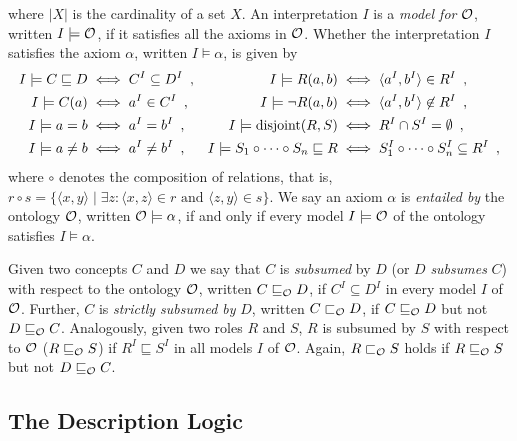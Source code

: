 where $|X|$ is the cardinality of a set $X$.
An interpretation $I$ is a \emph{model for} $\mathcal{O}$, written $I \models \mathcal{O}$, if it satisfies all the axioms in $\mathcal{O}$. Whether the interpretation $I$ satisfies the axiom $\alpha$, written $I \models \alpha$, is given by
\begin{align*}
  I \models C \sqsubseteq D &\iff C^I \subseteq D^I \enspace, &
  I \models R(a, b) &\iff \langle a^I, b^I \rangle \in R^I \enspace,\\
  I \models C(a) &\iff a^I \in C^I \enspace, &
  I \models \lnot R(a, b) &\iff \langle a^I, b^I \rangle \not\in R^I \enspace, \\
  I \models a = b &\iff a^I = b^I \enspace, &
  I \models \operatorname{disjoint}(R, S) &\iff R^I \cap S^I = \emptyset \enspace, \\
  I \models a \not= b &\iff a^I \not= b^I \enspace, &
  I \models S_1 \circ \cdots \circ S_n \sqsubseteq R &\iff S_1^I \circ \cdots \circ S_n^I \subseteq R^I \enspace,
\end{align*}
where $\circ$ denotes the composition of relations, that is, $r \circ s = \{ \langle x, y \rangle \mid \exists z : \langle x, z \rangle \in r \text{ and } \langle z, y \rangle \in s \}$. We say an axiom $\alpha$ is \emph{entailed by} the ontology $\mathcal{O}$, written $\mathcal{O} \models \alpha$, if and only if every model $I \models \mathcal{O}$ of the ontology satisfies $I \models \alpha$.

Given two concepts $C$ and $D$ we say that $C$ is \emph{subsumed} by $D$ (or $D$ \emph{subsumes} $C$) with respect to the ontology $\mathcal{O}$, written $C \sqsubseteq_\mathcal{O} D$, if $C^I \subseteq D^I$ in every model $I$ of $\mathcal{O}$. Further, $C$ is \emph{strictly subsumed by} $D$, written $C \sqsubset_\mathcal{O} D$, if $C \sqsubseteq_\mathcal{O} D$ but not $D \sqsubseteq_\mathcal{O} C$. Analogously, given two roles $R$ and $S$, $R$ is subsumed by $S$ with respect to $\mathcal{O}$ ($R \sqsubseteq_\mathcal{O} S$) if $R^I \sqsubseteq S^I$ in all models $I$ of $\mathcal{O}$. Again, $R \sqsubset_\mathcal{O} S$ holds if $R \sqsubseteq_\mathcal{O} S$ but not $D \sqsubseteq_\mathcal{O} C$.

\subsection{The \ALC Description Logic}

